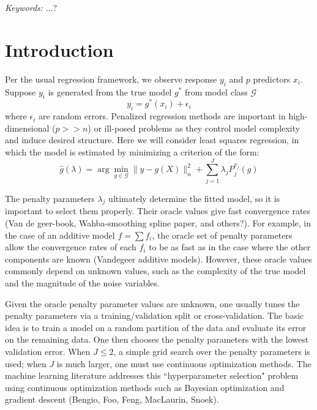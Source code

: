 \documentclass[12pt]{article}
\begin{document}
\noindent%
{\it Keywords:}  ...?
\vfill

\newpage
{} %
\section{Introduction}

Per the usual regression framework, we observe response $y_i$ and $p$ predictors $x_i$. Suppose $y_i$ is generated from the true model $g^*$ from model class $\mathcal{G}$
\begin{equation}
y_i = g^*(x_i) + \epsilon_i
\end{equation}
where $\epsilon_i$ are random errors. Penalized regression methods are important in high-dimensional ($p >> n$) or ill-posed problems as they control model complexity and induce desired structure. Here we will consider least squares regression, in which the model is estimated by minimizing a criterion of the form:
\begin{equation}
\label{orig_train_criterion}
\hat{g}(\lambda) = \arg\min_{g\in \mathcal{G}} \| y -  g(X) \|^2_n + \sum_{j=1}^J \lambda_j P^{v_j}_j(g)
\end{equation}

The penalty parameters $\lambda_j$ ultimately determine the fitted model, so it is important to select them properly. Their oracle values give fast convergence rates (Van de geer-book, Wahba-smoothing spline paper, and others?). For example, in the case of an additive model $f = \sum f_i$, the oracle set of penalty parameters allow the convergence rates of each $f_i$ to be as fast as in the case where the other components are known (Vandegeer additive models). However, these oracle values commonly depend on unknown values, such as the complexity of the true model and the magnitude of the noise variables.

Given the oracle penalty parameter values are unknown, one usually tunes the penalty parameters via a training/validation split or cross-validation. The basic idea is to train a model on a random partition of the data and evaluate its error on the remaining data. One then chooses the penalty parameters with the lowest validation error. When $J \le 2$, a simple grid search over the penalty parameters is used; when $J$ is much larger, one must use continuous optimization methods. The machine learning literature addresses this ``hyperparameter selection" problem using continuous optimization methods such as Bayesian optimization and gradient descent (Bengio, Foo, Feng, MacLaurin, Snoek).
\end{document}
